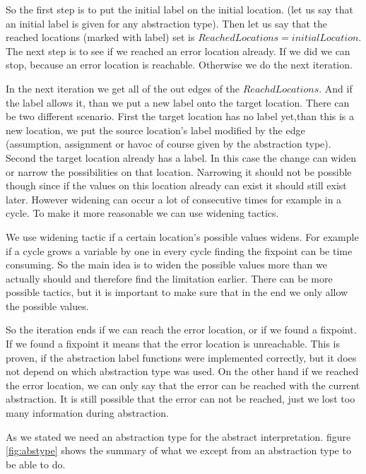 So the first step is to put the initial label on the initial location. (let us say that an initial label is given for any abstraction type). Then let us say that the reached locations (marked with label) set is $ReachedLocations={initialLocation}$. The next step is to see if we reached an error location already. If we did we can stop, because an error location is reachable. Otherwise we do the next iteration.

In the next iteration we get all of the out edges of the $ReachdLocations$. And if the label allows it, than we put a new label onto the target location. There can be two different scenario. First the target location has no label yet,than this is a new location, we put the source location's label modified by the edge (assumption, assignment or havoc of course given by the abstraction type). Second the target location already has a label. In this case the change can widen or narrow the possibilities on that location. Narrowing it should not be possible though since if the values on this location already can exist it should still exist later. However widening can occur a lot of consecutive times for example in a cycle. To make it more reasonable we can use widening tactics.

We use widening tactic if a certain location's possible values widens. For example if a cycle grows a variable by one in every cycle finding the fixpoint can be time consuming. So the main idea is to widen the possible values more than we actually should and therefore find the limitation earlier. There can be more possible tactics, but it is important to make sure that in the end we only allow the possible values.

So the iteration ends if we can reach the error location, or if we found a fixpoint. If we found a fixpoint it means that the error location is unreachable. This is proven, if the abstraction label functions were implemented correctly, but it does not depend on which abstraction type was used. On the other hand if we reached the error location, we can only say that the error can be reached with the current abstraction. It is still possible that the error can not be reached, just we lost too many information during abstraction.

As we stated we need an abstraction type for the abstract interpretation. figure \ref{fig:abstype} shows the summary of what we except from an abstraction type to be able to do.


